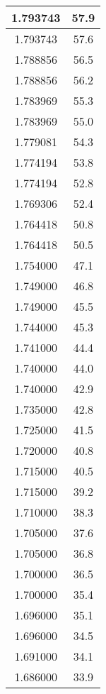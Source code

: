 \documentclass[a4paper,12pt]{article}
\begin{document}
\begin{center}
\begin{longtable}{|c|c|}
1.793743 & 57.9 \\ \hline
1.793743 & 57.6 \\ \hline
1.788856 & 56.5 \\ \hline
1.788856 & 56.2 \\ \hline
1.783969 & 55.3 \\ \hline
1.783969 & 55.0 \\ \hline
1.779081 & 54.3 \\ \hline
1.774194 & 53.8 \\ \hline
1.774194 & 52.8 \\ \hline
1.769306 & 52.4 \\ \hline
1.764418 & 50.8 \\ \hline
1.764418 & 50.5 \\ \hline
1.754000 & 47.1 \\ \hline
1.749000 & 46.8 \\ \hline
1.749000 & 45.5 \\ \hline
1.744000 & 45.3 \\ \hline
1.741000 & 44.4 \\ \hline
1.740000 & 44.0 \\ \hline
1.740000 & 42.9 \\ \hline
1.735000 & 42.8 \\ \hline
1.725000 & 41.5 \\ \hline
1.720000 & 40.8 \\ \hline
1.715000 & 40.5 \\ \hline
1.715000 & 39.2 \\ \hline
1.710000 & 38.3 \\ \hline
1.705000 & 37.6 \\ \hline
1.705000 & 36.8 \\ \hline
1.700000 & 36.5 \\ \hline
1.700000 & 35.4 \\ \hline
1.696000 & 35.1 \\ \hline
1.696000 & 34.5 \\ \hline
1.691000 & 34.1 \\ \hline
1.686000 & 33.9 \\ \hline

\end{longtable}
\end{center}
\end{document}
